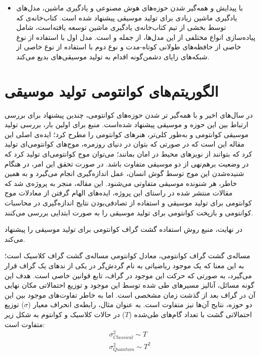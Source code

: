 \begin{itemize}
\item 
با پیدایش و همه‌گیر شدن حوزه‌های هوش مصنوعی و یادگیری ماشین، مدل‌های یادگیری ماشین زیادی برای تولید موسیقی پیشنهاد شده است.
کتاب‌خانه‌ی 
که توسط بخشی از تیم کتاب‌خانه‌ی یادگیری ماشین
توسعه یافته‌است، شامل پیاده‌سازی انواع مختلفی از این مدل‌ها، از جمله
\cite{magenta_melodyrnn}
و
\cite{magenta_gansynth}
است. مدل اول با استفاده از نوع خاصی از حافظه‌های طولانی کوتاه-مدت
و نوع دوم با استفاده از نوع خاصی از شبکه‌های زایای دشمن‌گونه اقدام به تولید موسیقی‌های بدیع می‌کند.
\end{itemize}

\section{الگوریتم‌های کوانتومی تولید موسیقی}

در سال‌های اخیر و با همه‌گیر تر شدن حوزه‌های کوانتومی، چندین پیشنهاد برای بررسی ارتباط بین این حوزه و موسیقی پیشنهاد شده‌است. منبع
\cite{Putz_quantum_music}
برای اولین بار، بررسی تولید موسیقی کوانتومی
و به‌طور کلی‌تر، هنرهای کوانتومی
را مطرح کرد؛ ایده‌ی اصلی این مقاله این است که در صورتی که بتوان در دنیای روزمره، موج‌های کوانتومی‌ای تولید کرد که بتوانند از نویزهای محیط در امان بمانند؛ می‌توان موج کوانتومی‌ای تولید کرد که در وضعیت برهم‌نهی از دو موسیقی متفاوت باشد. در صورت تحقق این امر، در هنگام شنیده‌شدن این موج توسط گوش انسان، عمل اندازه‌گیری انجام می‌گیرد و به همین خاطر، هر شنونده موسیقی متفاوتی می‌شنود.
این مقاله، منجر به پروژه‌ی
\cite{quantum_music_event}
شد که مقالات منتشر شده در راستای این پروژه، ایده‌های الهام گرفتن از معادلات موج کوانتومی برای تولید موسیقی
\cite{Helweg_QInspired_Music}
و استفاده از تصادفی‌بودن نتایج اندازه‌گیری در محاسبات کوانتومی و بازپخت کوانتومی
برای تولید موسیقی
\cite{Kirke_QC_Music}
را به صورت ابتدایی بررسی می‌کنند.

در نهایت، منبع
\cite{miranda}
روش استفاده گشت گراف کوانتومی
برای تولید موسیقی را پیشنهاد می‌کند.

مساله‌ی گشت گراف کوانتومی، معادل کوانتومی مساله‌ی گشت گراف کلاسیک است؛ به این معنا که یک موجود ریاضیاتی به نام گردش‌گر
در یکی از ندهای یک گراف قرار می‌گیرد، به صورتی که حرکت این موجود در گراف، تابع قوانین خاصی است. هدف این گونه مسائل، آنالیز مسیرهای طی شده توسط این موجود و توزیع احتمالاتی
مکان نهایی آن در گراف بعد از گذشت زمان مشخصی است.
اما به خاطر تفاوت‌های موجود بین این دو حوزه، نتایج آن‌ها نیز متفاوت است.
\cite{Kempe_qwalk}
به عنوان مثال، رابطه‌ی انحراف معیار
($\sigma$)
توزیع احتمالاتی گشت با تعداد گام‌های طی‌شده
($T$)
در حالات کلاسیک و کوانتوم به شکل زیر متفاوت است:
\begin{equation}
\begin{gathered}
    \sigma^2_{Classical} \sim T \\[3pt]
    \sigma^2_{Quantum} \sim T^2
\end{gathered}
\end{equation}

